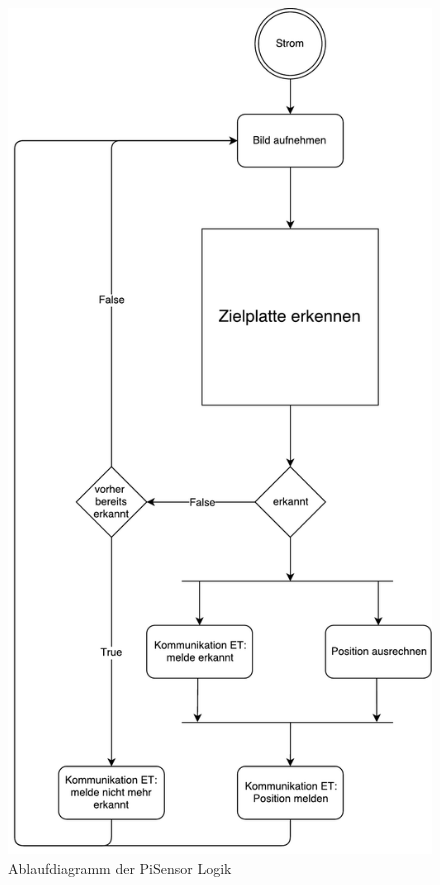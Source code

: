 \documentclass[a4paper]{report}
\begin{document}
\begin{figure}[h!]
	\centering
	\includegraphics[keepaspectratio,height=0.4\textheight]{Ablaufdiagramm_ModusOperandi}
	\caption{Ablaufdiagramm der PiSensor Logik}
	\label{fig:AblaufZielerkennung}
\end{figure}
\end{document}

